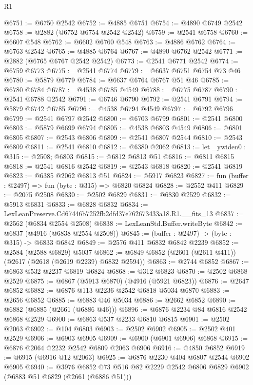 \begin{lexlean}{R1}
\begin{coremodule}
@6751 := @6750 @2542
@6752 := @4885 @6751
@6754 := @4890 @6749 @2542
@6758 := @2882 (@6752 @6754 @2542 @2542)
@6759 := @2541 @6758
@6760 := @6607 @548
@6762 := @6602 @6760 @548
@6763 := @4886 @6762
@6764 := @6763 @2542
@6765 := @4885 @6764
@6767 := @4890 @6762 @2542
@6771 := @2882 (@6765 @6767 @2542 @2542)
@6773 := @2541 @6771 @2542
@6774 := @6759 @6773
@6775 := @2541 @6774
@6779 := @6637 @6751 @6754 @73 @46
@6780 := @5879 @6779
@6784 := @6637 @6764 @6767 @51 @46
@6785 := @6780 @6784
@6787 := @4538 @6785 @4549
@6788 := @6775 @6787
@6790 := @2541 @6788 @2542
@6791 := @6746 @6790
@6792 := @2541 @6791
@6794 := @5879 @6742 @6785
@6796 := @4538 @6794 @4549
@6797 := @6792 @6796
@6799 := @2541 @6797 @2542
@6800 := @6703 @6799
@6801 := @2541 @6800
@6803 := @5879 @6699 @6794
@6805 := @4538 @6803 @4549
@6806 := @6801 @6805
@6807 := @2543 @6806
@6809 := @2541 @6807 @2544
@6810 := @2543 @6809
@6811 := @2541 @6810
@6812 := @6380 @2062
@6813 := let _ywiden0 : @315 := @2508; @6803
@6815 := @6812 @6813 @51
@6816 := @6811 @6815
@6818 := @2541 @6816 @2542
@6819 := @2543 @6818
@6820 := @2541 @6819
@6823 := @6385 @2062 @6813 @51
@6824 := @5917 @6823
@6827 := fun (buffer : @2497) => fun (byte : @315) => @6820 @6824
@6828 := @2552 @411
@6829 := @2075 @2508
@6830 := @2502 @6829
@6831 := @6830 @2529
@6832 := @5913 @6831
@6833 := @6828 @6832
@6834 := LexLeanPreserve.Cd67446b7252fb2dfd37e762673433a18.R1.__fits_13
@6837 := @2562 (@6834 @2554 @2508)
@6838 := LexLeanStd.Buffer.writeByte
@6842 := @6837 (@4916 (@6838 @2554 @2508))
@6845 := (buffer : @2497) -> (byte : @315) -> @6833 @6842
@6849 := @2576 @411 @6832 @6842 @2239
@6852 := @2584 (@2588 @6829) @5037
@6862 := @6849 @6852 (@2601 (@2611 @411)) (@2617 (@2618 (@2619 @2239) @6832 @2594))
@6863 := @2744 @6852
@6867 := @6863 @532 @2237 @6819 @6824
@6868 := @312 @6823
@6870 := @2502 @6868 @2529
@6875 := @6867 (@5913 @6870) (@4916 (@5921 @6823))
@6876 := @2647 @6852
@6882 := @6876 @113 @2236 @2542 @6818 @5034 @6870
@6883 := @2656 @6852
@6885 := @6883 @46 @5034
@6886 := @2662 @6852
@6890 := @6882 (@6885 (@2661 (@6886 @46)))
@6896 := @6876 @2234 @84 @6816 @2542 @6868 @2529
@6900 := @6863 @537 @2233 @6810 @6815
@6901 := @2502 @2063
@6902 := @104 @6803
@6903 := @2502 @6902
@6905 := @2502 @401 @2529
@6906 := @6903 @6905
@6909 := @6900 (@6901 @6906) @6868
@6915 := @6876 @2064 @2232 @2542 @6809 @2063 @6906
@6916 := @4850 @6852
@6919 := @6915 (@6916 @12 @2063)
@6925 := @6876 @2230 @404 @6807 @2544 @6902 @6905
@6940 := @3976
    @6852
    @73
    @516
    @82
    @2229
    @2542
    @6806
    @6829
    @6902
    (@6883 @51 @6829 (@2661 (@6886 @51)))

\end{coremodule}
\end{lexlean}

